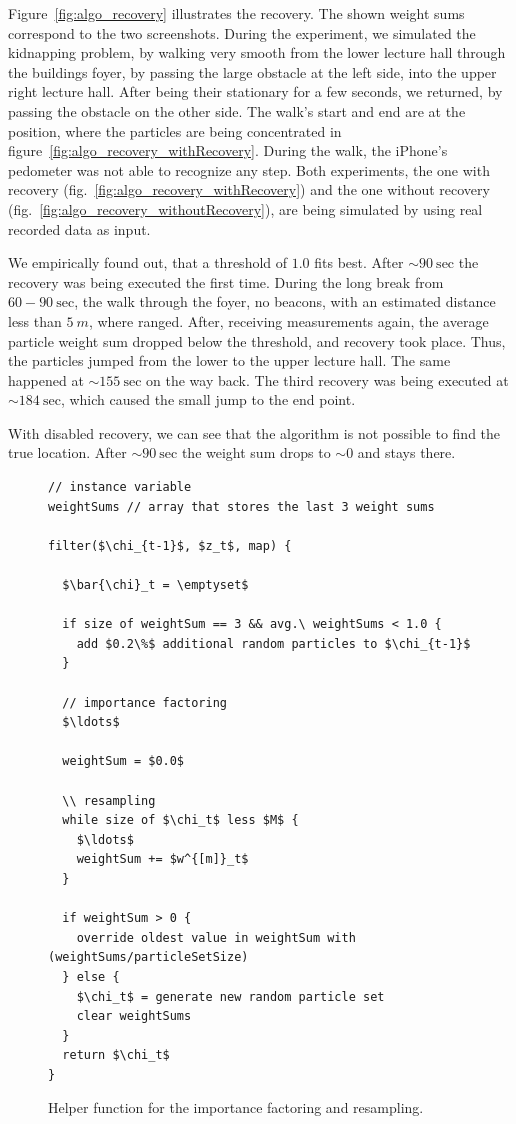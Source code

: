 Figure~\ref{fig:algo_recovery} illustrates the recovery. The shown weight sums correspond to the two screenshots. During the experiment, we simulated the kidnapping problem, by walking very smooth from the lower lecture hall through the buildings foyer, by passing the large obstacle at the left side, into the upper right lecture hall. After being their stationary for a few seconds, we returned, by passing the obstacle on the other side. The walk's start and end are at the position, where the particles are being concentrated in figure~\ref{fig:algo_recovery_withRecovery}. During the walk, the iPhone's pedometer was not able to recognize any step. Both experiments, the one with recovery (fig.~\ref{fig:algo_recovery_withRecovery}) and the one without recovery (fig.~\ref{fig:algo_recovery_withoutRecovery}), are being simulated by using real recorded data as input.

We empirically found out, that a threshold of $1.0$ fits best. After $\sim 90~\text{sec}$ the recovery was being executed the first time. During the long break from $60 - 90~\text{sec}$, the walk through the foyer, no beacons, with an estimated distance less than $5~m$, where ranged. After, receiving measurements again, the average particle weight sum dropped below the threshold, and recovery took place. Thus, the particles jumped from the lower to the upper lecture hall. The same happened at $\sim 155~\text{sec}$ on the way back. The third recovery was being executed at $\sim 184~\text{sec}$, which caused the small jump to the end point.

With disabled recovery, we can see that the algorithm is not possible to find the true location. After $\sim 90~\text{sec}$ the weight sum drops to $\sim 0$ and stays there.


\begin{figure}
\begin{lstlisting}[mathescape]
// instance variable
weightSums // array that stores the last 3 weight sums

filter($\chi_{t-1}$, $z_t$, map) {
  
  $\bar{\chi}_t = \emptyset$
  
  if size of weightSum == 3 && avg.\ weightSums < 1.0 {
    add $0.2\%$ additional random particles to $\chi_{t-1}$ 
  }

  // importance factoring
  $\ldots$
    
  weightSum = $0.0$
  
  \\ resampling
  while size of $\chi_t$ less $M$ {
    $\ldots$
    weightSum += $w^{[m]}_t$
  }
  
  if weightSum > 0 { 
    override oldest value in weightSum with (weightSums/particleSetSize)
  } else {
    $\chi_t$ = generate new random particle set
    clear weightSums
  }
  return $\chi_t$
}		
\end{lstlisting}
\caption{Helper function for the importance factoring and resampling.}
\label{lst:pf_recovery}
\end{figure}

